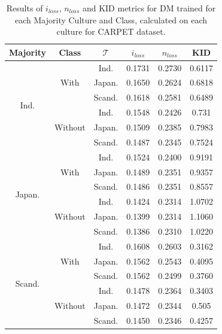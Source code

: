 \begin{table}[]
\centering
\begin{tabular}{c|c|c|c|c|c}
    \textbf{Majority} & \textbf{Class} & \textbf{$\mathcal{T}$} & \textbf{$i_{loss}$} & \textbf{$n_{loss}$} & \textbf{KID} \\
    \toprule
\multirow{6}{*}{Ind.} & \multirow{3}{*}{With} & Ind. & 0.1731 & 0.2730 & 0.6117  \\
 &  & Japan. & 0.1650 & 0.2624 & 0.6818  \\
 &  & Scand. & 0.1618 & 0.2581 & 0.6489\\
\hhline{~-----}
 & \multirow{3}{*}{Without} & Ind. & 0.1548 & 0.2426 & 0.731  \\
 &  & Japan. & 0.1509 & 0.2385 & 0.7983  \\
 &  & Scand. & 0.1487 & 0.2345 & 0.7524  \\
\midrule
\multirow{6}{*}{Japan.} & \multirow{3}{*}{With} & Ind. & 0.1524 & 0.2400 & 0.9191  \\
 &  & Japan. & 0.1489 & 0.2351 & 0.9357  \\
 &  & Scand. & 0.1486 & 0.2351 & 0.8557  \\
\hhline{~-----}
 & \multirow{3}{*}{Without} & Ind. & 0.1424 & 0.2314 & 1.0702  \\
 &  & Japan. & 0.1399 & 0.2314 & 1.1060 \\
 &  & Scand. & 0.1386 & 0.2310 & 1.0220  \\
\midrule
\multirow{6}{*}{Scand.} & \multirow{3}{*}{With} & Ind. & 0.1608 & 0.2603 & 0.3162 \\
 &  & Japan. & 0.1562 & 0.2543 & 0.4095  \\
 &  & Scand. & 0.1562 & 0.2499 & 0.3760  \\
\hhline{~-----}
 & \multirow{3}{*}{Without} & Ind. & 0.1478 & 0.2364 & 0.3403  \\
 &  & Japan. & 0.1472 & 0.2344 & 0.505 \\
 &  & Scand. & 0.1450 & 0.2346 & 0.4257  \\
\bottomrule
    \end{tabular}
    \caption{Results of $i_{loss}$, $n_{loss}$ and KID metrics for DM trained for each Majority Culture and Class, calculated on each culture for CARPET dataset.}
    \label{ch3:tab:ris:dm:carpet}
\end{table}
%
%
